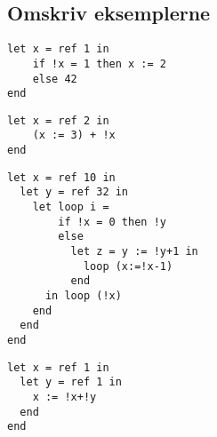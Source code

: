 \documentclass[11pt,a4paper]{article}
\begin{document}
\subsection{Omskriv eksemplerne}
\begin{lstlisting}[style=fsharp]
let x = ref 1 in 
    if !x = 1 then x := 2 
    else 42 
end
\end{lstlisting}
\begin{lstlisting}[style=fsharp]
let x = ref 2 in 
    (x := 3) + !x 
end
\end{lstlisting}
\begin{lstlisting}[style=fsharp]
let x = ref 10 in 
  let y = ref 32 in
    let loop i =  
        if !x = 0 then !y
        else 
          let z = y := !y+1 in
            loop (x:=!x-1)
          end
      in loop (!x)
    end
  end
end
\end{lstlisting}
\begin{lstlisting}[style=fsharp]
let x = ref 1 in 
  let y = ref 1 in
    x := !x+!y
  end
end
\end{lstlisting}
\end{document}

